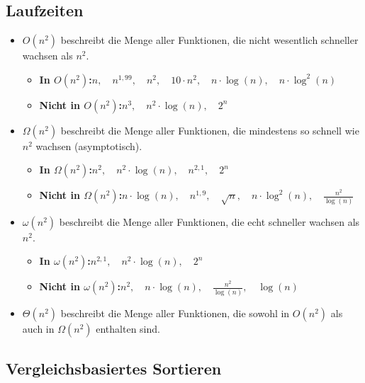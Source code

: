 \documentclass{scrartcl}%
\begin{document}

    \subsection*{Laufzeiten}
    \label{subsec:laufzeiten}

    \begin{itemize}
        \item $O(n^2)$ beschreibt die Menge aller Funktionen, die nicht wesentlich schneller wachsen als $n^2$.
        \begin{itemize}
            \item \textbf{In $O(n^2)$:}\quad $n,\quad n^{1,99}, \quad n^2, \quad 10 \cdot n^2,\quad n \cdot \log(n),\quad n \cdot \log^2(n)$
            \item \textbf{Nicht in $O(n^2)$:}\quad $n^3, \quad n^2 \cdot \log(n),\quad 2^n$
        \end{itemize}
        \item $\Omega(n^2)$ beschreibt die Menge aller Funktionen, die mindestens so schnell wie $n^2$ wachsen (asymptotisch).
        \begin{itemize}
            \item \textbf{In $\Omega(n^2)$:}\quad $n^2,\quad n^2 \cdot \log(n),\quad n^{2,1},\quad 2^n$
            \item \textbf{Nicht in $\Omega(n^2)$:}\quad $n \cdot \log(n),\quad n^{1,9},\quad \sqrt{n},\quad n \cdot \log^2(n),\quad \frac{n^2}{\log(n)}$
        \end{itemize}
        \item $\omega(n^2)$ beschreibt die Menge aller Funktionen, die echt schneller wachsen als $n^2$.
        \begin{itemize}
            \item \textbf{In $\omega(n^2)$:}\quad $n^{2,1},\quad n^2 \cdot \log(n), \quad 2^n$
            \item \textbf{Nicht in $\omega(n^2)$:}\quad $n^2, \quad n \cdot \log(n), \quad \frac{n^2}{\log(n)}, \quad \log(n)$
        \end{itemize}
        \item $\Theta(n^2)$ beschreibt die Menge aller Funktionen, die sowohl in $O(n^2)$ als auch in $\Omega(n^2)$ enthalten sind.
    \end{itemize}

    \subsection*{Vergleichsbasiertes Sortieren}
    \label{subsec:vergleichsbasiertessortieren}
\end{document}
